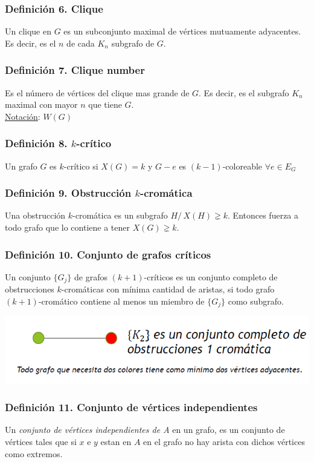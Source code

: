 \documentclass{article}
\newcommand{\tq}{/\,}                                   %
\begin{document}
\subsubsection*{Definición 6. Clique}
Un clique en $G$ es un subconjunto maximal de vértices mutuamente adyacentes.
Es decir, es el $n$ de cada $K_n$ subgrafo de $G$.

\subsubsection*{Definición 7. Clique number}
Es el número de vértices del clique mas grande de $G$.
Es decir, es el subgrafo $K_n$ maximal con mayor $n$ que tiene $G$.
\\\underline{Notación}: $W(G)$

\subsubsection*{Definición 8. $k$-crítico}
Un grafo $G$ es $k$-crítico si $X(G) = k$ y $G-e$ es $(k-1)$-coloreable $\forall e \in E_G$

\subsubsection*{Definición 9. Obstrucción $k$-cromática}
Una obstrucción $k$-cromática es un subgrafo $H \tq  X(H) \gneq k$.
Entonces fuerza a todo grafo que lo contiene a tener $X(G) \gneq k$.

\subsubsection*{Definición 10. Conjunto de grafos críticos}
Un conjunto $\{G_j\}$ de grafos $(k + 1)$-críticos es un conjunto completo de
obstrucciones $k$-cromáticas con mínima cantidad de aristas, si todo grafo \\$(k + 1)$-cromático
contiene al menos un miembro de $\{G_j\}$ como subgrafo.
\begin{center}
    \includegraphics[width=.60\textwidth]{k2CjtoGrafoCritico.PNG}
\end{center} 

\subsubsection*{Definición 11. Conjunto de vértices independientes}
Un \emph{conjunto de vértices independientes de A} en un grafo, es un conjunto de vértices tales que
si $x$ e $y$ estan en $A$ en el grafo no hay arista con dichos vértices como extremos.
\end{document}
